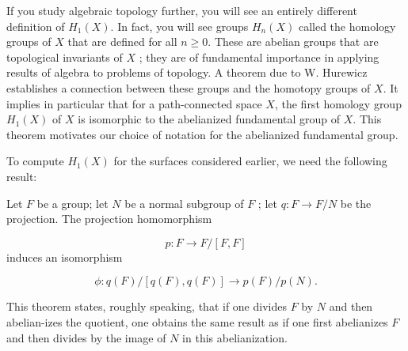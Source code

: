 If you study algebraic topology further, you will see an entirely different definition of \(H_{1}( X)\). In fact, you will see groups \(H_{n}( X)\) called the homology groups of \(X\) that are defined for all \(n \geq 0\). These are abelian groups that are topological invariants of \(X\) ; they are of fundamental importance in applying results of algebra to problems of topology. A theorem due to W. Hurewicz establishes a connection between these groups and the homotopy groups of \(X\). It implies in particular that for a path-connected space \(X\), the first homology group \(H_{1}( X)\) of \(X\) is isomorphic to the abelianized fundamental group of \(X\). This theorem motivates our choice of notation for the abelianized fundamental group.

To compute \(H_{1}( X)\) for the surfaces considered earlier, we need the following result:

\begin{theorem}
\label{thm:\thetheorem}
	Let \(F\) be a group; let \(N\) be a normal subgroup of \(F\) ; let \(q : F \rightarrow F/N\) be the projection. The projection homomorphism

\[
p : F \rightarrow F/[ {F,F}]
\]
induces an isomorphism

\[
\phi : q( F) /[ {q( F),q( F) }] \rightarrow p( F) /p( N).
\]

This theorem states, roughly speaking, that if one divides \(F\) by \(N\) and then abelian-izes the quotient, one obtains the same result as if one first abelianizes \(F\) and then divides by the image of \(N\) in this abelianization.
\end{theorem}

